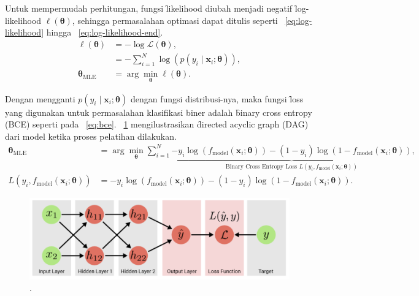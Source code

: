     Untuk mempermudah perhitungan, fungsi \f{likelihood} diubah menjadi negatif \f{log-likelihood} $\mathcal{\ell}(\bm{\theta})$, sehingga permasalahan optimasi dapat ditulis seperti \equ~\ref{eq:log-likelihood} hingga \equ~\ref{eq:log-likelihood-end}.
    \begin{align}
        \label{eq:log-likelihood}
        \ell{(\bm{\theta})} &= -\log\mathcal{L}(\bm{\theta}), \\
        &= -\sum_{i=1}^N \log\left(p(y_i \mid \mathbf{x}_i; \bm{\theta})\right), \\
        \label{eq:log-likelihood-end}
        \bm{\theta}_{\text{MLE}} &= \arg\min_{\bm{\theta}} \ell(\bm{\theta}).
    \end{align} 

    Dengan mengganti $p(y_i \mid \mathbf{x}_i; \bm{\theta})$ dengan fungsi distribusi-nya, maka fungsi \f{loss} yang digunakan untuk permasalahan klasifikasi biner adalah \f{binary cross entropy} (BCE) seperti pada \equ~\ref{eq:bce}. \pic~\ref{fig:dl-training-graph-dag} mengilustrasikan \f{directed acyclic graph} (DAG) dari model ketika proses pelatihan dilakukan.
    \begin{align}
        \bm{\theta}_{\text{MLE}} &= \arg\min_{\bm{\theta}}\sum_{i=1}^{N}\underbrace{-y_i \log\left(f_{\text{model}}(\mathbf{x}_i; \bm{\theta})\right) - (1 - y_i) \log\left(1 - f_{\text{model}}(\mathbf{x}_i; \bm{\theta})\right)}_{\text{Binary Cross Entropy Loss } L(y_i, f_{\text{model}}(\mathbf{x}_i; \bm{\theta}))}, \\
        \label{eq:bce} 
        L(y_i, f_{\text{model}}(\mathbf{x}_i; \bm{\theta})) &= -y_i \log\left(f_{\text{model}}(\mathbf{x}_i; \bm{\theta})\right) - (1 - y_i) \log\left(1 - f_{\text{model}}(\mathbf{x}_i; \bm{\theta})\right).
    \end{align}
    \begin{figure}
        \centering
        \includegraphics[width=1\textwidth]{assets/pics/dl-training-graph.png}
        \caption{\license.}
        \label{fig:dl-training-graph-dag}
    \end{figure}

